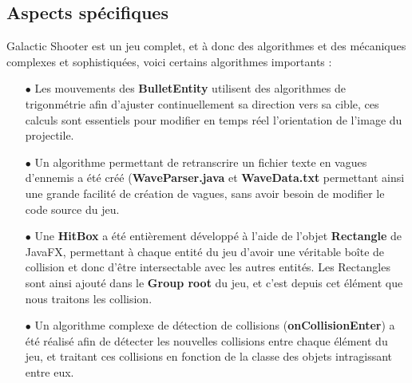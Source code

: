 \documentclass[12pt]{article}
\begin{document}
{\subsection{Aspects spécifiques}

Galactic Shooter est un jeu complet, et à donc des algorithmes et des mécaniques complexes et sophistiquées, voici certains algorithmes importants : 
\begin{itemize}
    \item[$\bullet$] Les mouvements des \textbf{BulletEntity} utilisent des algorithmes de trigonmétrie afin d'ajuster continuellement sa direction vers sa cible, ces calculs sont essentiels pour modifier en temps réel l'orientation de l'image du projectile.\newline
    
    \item[$\bullet$] Un algorithme permettant de retranscrire un fichier texte en vagues d'ennemis a été créé (\textbf{WaveParser.java} et \textbf{WaveData.txt} permettant ainsi une grande facilité de création de vagues, sans avoir besoin de modifier le code source du jeu.\newline

    \item[$\bullet$] Une \textbf{HitBox} a été entièrement développé à l'aide de l'objet \textbf{Rectangle} de JavaFX, permettant à chaque entité du jeu d'avoir une véritable boîte de collision et donc d'être intersectable avec les autres entités. Les Rectangles sont ainsi ajouté dans le \textbf{Group root} du jeu, et c'est depuis cet élément que nous traitons les collision.\newline

    \item[$\bullet$] Un algorithme complexe de détection de collisions (\textbf{onCollisionEnter}) a été réalisé afin de détecter les nouvelles collisions entre chaque élément du jeu, et traitant ces collisions en fonction de la classe des objets intragissant entre eux.\newline \newline \newline \newline \newline \newline \newline
    
\end{itemize} 


}
\end{document}
